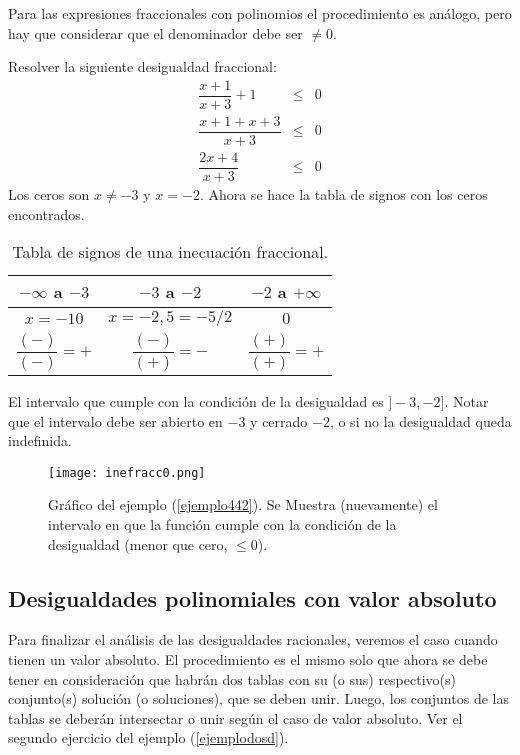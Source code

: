 Para las expresiones fraccionales con polinomios el procedimiento es análogo, pero hay que considerar que el denominador debe ser $\neq 0$.\\

\begin{myexample}
\label{ejemplo442}
Resolver la siguiente desigualdad fraccional:\\
\begin{eqnarray}
\dfrac{x+1}{x+3}+1&\leq &0 \\
\dfrac{x+1+x+3}{x+3} &\leq &0 \\
\dfrac{2x+4}{x+3}& \leq & 0 
\end{eqnarray} 
Los ceros son $x\neq-3$ y $x=-2$. Ahora se hace la tabla de signos con los ceros encontrados.\\
\begin{center}
\begin{table}[h!]
\centering
\begin{tabular}{|c|c|c|}
\hline
$-\infty$ a $-3$&$-3$ a $-2$& $-2$ a $+\infty$ \\
\hline
$x=-10$&$x=-2,5=-5/2$&$0$ \\
$\dfrac{(-)}{(-)}=+$&$\dfrac{(-)}{(+)}=-$&$\dfrac{(+)}{(+)}=+$ \\
\hline 
\end{tabular}
\caption[Tabla de signos de una inecuación fraccional.]{Tabla de signos de una inecuación fraccional.}
\end{table}
\end{center}
El intervalo que cumple con la condición de la desigualdad es $]-3,-2]$. Notar que el intervalo debe ser abierto en $-3$ y cerrado $-2$, o si no la desigualdad queda indefinida.
\end{myexample}

\begin{center}
\begin{figure}[h!]
\texttt{[image: inefracc0.png]}\caption[Gráfico del ejemplo (\ref{ejemplo442}).]{Gráfico del ejemplo (\ref{ejemplo442}). Se Muestra (nuevamente) el intervalo en que la función cumple con la condición de la desigualdad (menor que cero, $\leq 0$).}
\end{figure}
\end{center}
\newpage
\subsection{Desigualdades polinomiales con valor absoluto}
Para finalizar el análisis de las desigualdades racionales, veremos el caso cuando tienen un valor absoluto. El procedimiento es el mismo solo que ahora se debe tener en consideración que habrán dos tablas con su (o sus) respectivo(s) conjunto(s) solución (o soluciones), que se deben unir. Luego, los conjuntos de las tablas se deberán intersectar o unir según el caso de valor absoluto. Ver el segundo ejercicio del ejemplo (\ref{ejemplodosd}).


